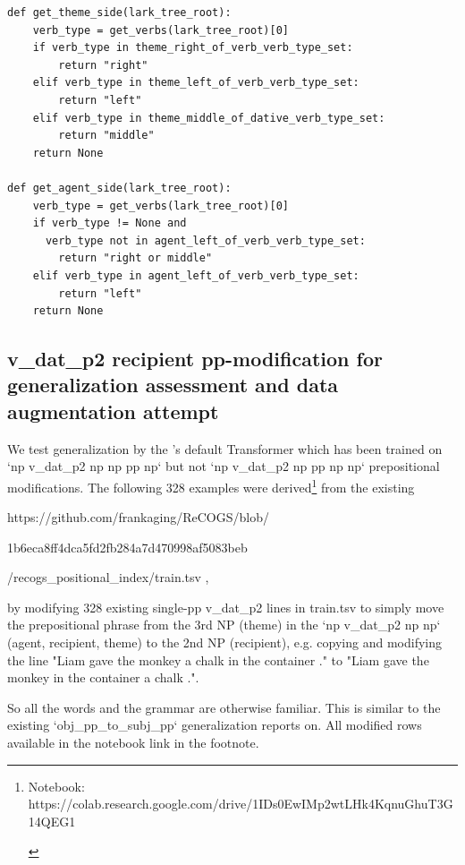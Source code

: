 \documentclass[11pt]{article}
\begin{document}
\begin{tiny}
\begin{verbatim}
def get_theme_side(lark_tree_root):
    verb_type = get_verbs(lark_tree_root)[0]
    if verb_type in theme_right_of_verb_verb_type_set:
        return "right"
    elif verb_type in theme_left_of_verb_verb_type_set:
        return "left"
    elif verb_type in theme_middle_of_dative_verb_type_set:
        return "middle"
    return None

def get_agent_side(lark_tree_root):
    verb_type = get_verbs(lark_tree_root)[0]
    if verb_type != None and 
      verb_type not in agent_left_of_verb_verb_type_set:
        return "right or middle"
    elif verb_type in agent_left_of_verb_verb_type_set:
        return "left"
    return None
\end{verbatim}
\end{tiny}

\clearpage
\subsection{v\_dat\_p2 recipient pp-modification for generalization assessment and data augmentation attempt}
\label{v_dat_p2_recipient_pp-modification_for_generalization_assessment_and_data_augmentation_attempt}

We test generalization by the \cite{Wu2023}'s default Transformer which has been trained on `np v\_dat\_p2 np np pp np` but not `np v\_dat\_p2 np pp np np` prepositional modifications.
The following 328 examples were derived\footnote{\begin{footnotesize} Notebook: https://colab.research.google.com/drive/1IDs0EwIMp2wtLHk4KqnuGhuT3G14QEG1 \end{footnotesize}} from the existing

https://github.com/frankaging/ReCOGS/blob/

1b6eca8ff4dca5fd2fb284a7d470998af5083beb

/recogs\_positional\_index/train.tsv , 

by modifying 328 existing single-pp v\_dat\_p2 lines in train.tsv to simply move the prepositional phrase from the 3rd NP (theme) in the `np v\_dat\_p2 np np` (agent, recipient, theme) to the 2nd NP (recipient), e.g. copying and modifying the line "Liam gave the monkey a chalk in the container ." to "Liam gave the monkey in the container a chalk .".

So all the words and the grammar are otherwise familiar. This is similar to the existing `obj\_pp\_to\_subj\_pp` generalization \cite{Wu2023} reports on.
All modified rows available in the notebook link in the footnote.
\end{document}
